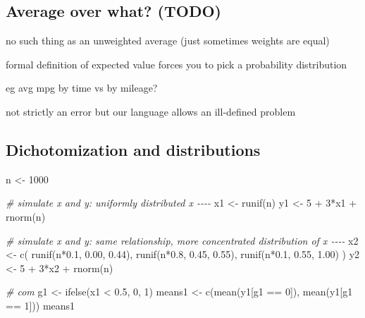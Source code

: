 \documentclass[
]{krantz}
\makeatletter
\newenvironment{Shaded}{\begin{snugshade}}{\end{snugshade}}
\newcommand{\CommentTok}[1]{\textcolor[rgb]{0.37,0.37,0.37}{\textit{#1}}}
\newcommand{\DecValTok}[1]{\textcolor[rgb]{0.06,0.06,0.06}{#1}}
\newcommand{\FloatTok}[1]{\textcolor[rgb]{0.06,0.06,0.06}{#1}}
\newcommand{\FunctionTok}[1]{\textcolor[rgb]{0,0,0}{#1}}
\newcommand{\NormalTok}[1]{#1}
\newcommand{\OtherTok}[1]{\textcolor[rgb]{0.37,0.37,0.37}{#1}}
\newcommand{\SpecialCharTok}[1]{\textcolor[rgb]{0,0,0}{#1}}
\newenvironment{kframe}{%
\medskip{}
\setlength{\fboxsep}{.8em}
 \def\at@end@of@kframe{}%
 \ifinner\ifhmode%
  \def\at@end@of@kframe{\end{minipage}}%
  \begin{minipage}{\columnwidth}%
 \fi\fi%
 \def\FrameCommand##1{\hskip\@totalleftmargin \hskip-\fboxsep
 \colorbox{shadecolor}{##1}\hskip-\fboxsep
     \hskip-\linewidth \hskip-\@totalleftmargin \hskip\columnwidth}%
 \MakeFramed {\advance\hsize-\width
   \@totalleftmargin\z@ \linewidth\hsize
   \@setminipage}}%
 {\par\unskip\endMakeFramed%
 \at@end@of@kframe}
\renewenvironment{Shaded}{\begin{kframe}}{\end{kframe}}
\makeatother
\begin{document}
\hypertarget{average-over-what-todo}{%
\subsection{Average over what? (TODO)}\label{average-over-what-todo}}

no such thing as an unweighted average (just sometimes weights are equal)

formal definition of expected value forces you to pick a probability distribution

eg avg mpg by time vs by mileage?

not strictly an error but our language allows an ill-defined problem

\hypertarget{dichotomization-and-distributions}{%
\subsection{Dichotomization and distributions}\label{dichotomization-and-distributions}}

\begin{Shaded}
\begin{Highlighting}[]
\NormalTok{n }\OtherTok{\textless{}{-}} \DecValTok{1000}

\CommentTok{\# simulate x and y: uniformly distributed x {-}{-}{-}{-}}
\NormalTok{x1 }\OtherTok{\textless{}{-}} \FunctionTok{runif}\NormalTok{(n)}
\NormalTok{y1 }\OtherTok{\textless{}{-}} \DecValTok{5} \SpecialCharTok{+} \DecValTok{3}\SpecialCharTok{*}\NormalTok{x1 }\SpecialCharTok{+} \FunctionTok{rnorm}\NormalTok{(n)}

\CommentTok{\# simulate x and y: same relationship, more concentrated distribution of x {-}{-}{-}{-}}
\NormalTok{x2 }\OtherTok{\textless{}{-}} \FunctionTok{c}\NormalTok{( }\FunctionTok{runif}\NormalTok{(n}\SpecialCharTok{*}\FloatTok{0.1}\NormalTok{, }\FloatTok{0.00}\NormalTok{, }\FloatTok{0.44}\NormalTok{), }
         \FunctionTok{runif}\NormalTok{(n}\SpecialCharTok{*}\FloatTok{0.8}\NormalTok{, }\FloatTok{0.45}\NormalTok{, }\FloatTok{0.55}\NormalTok{), }
         \FunctionTok{runif}\NormalTok{(n}\SpecialCharTok{*}\FloatTok{0.1}\NormalTok{, }\FloatTok{0.55}\NormalTok{, }\FloatTok{1.00}\NormalTok{) }
\NormalTok{        )}
\NormalTok{y2 }\OtherTok{\textless{}{-}} \DecValTok{5} \SpecialCharTok{+} \DecValTok{3}\SpecialCharTok{*}\NormalTok{x2 }\SpecialCharTok{+} \FunctionTok{rnorm}\NormalTok{(n)}

\CommentTok{\# com}
\NormalTok{g1 }\OtherTok{\textless{}{-}} \FunctionTok{ifelse}\NormalTok{(x1 }\SpecialCharTok{\textless{}} \FloatTok{0.5}\NormalTok{, }\DecValTok{0}\NormalTok{, }\DecValTok{1}\NormalTok{)}
\NormalTok{means1 }\OtherTok{\textless{}{-}} \FunctionTok{c}\NormalTok{(}\FunctionTok{mean}\NormalTok{(y1[g1 }\SpecialCharTok{==} \DecValTok{0}\NormalTok{]), }\FunctionTok{mean}\NormalTok{(y1[g1 }\SpecialCharTok{==} \DecValTok{1}\NormalTok{]))}
\NormalTok{means1 }
\end{Highlighting}
\end{Shaded}
\end{document}
